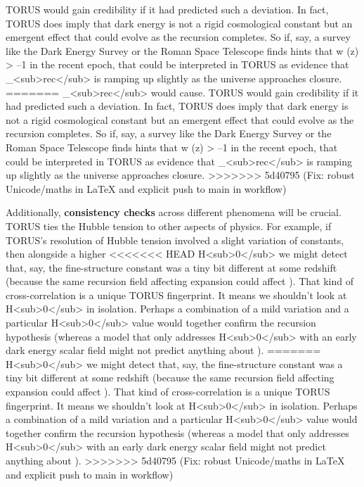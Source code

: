 \documentclass[]{article}
\begin{document}
TORUS would gain credibility if it had predicted such a deviation. In
fact, TORUS does imply that dark energy is not a rigid cosmological
constant but an emergent effect that could evolve as the recursion
completes\hspace{0pt}. So if, say, a survey like the Dark Energy Survey
or the Roman Space Telescope finds hints that w (z) \textgreater{} --1
in the recent epoch, that could be interpreted in TORUS as evidence that
\Lambda\_\textless sub\textgreater rec\textless/sub\textgreater{} is ramping
up slightly as the universe approaches closure.
=======
\Lambda\_\textless{}sub\textgreater{}rec\textless{}/sub\textgreater{} would
cause. TORUS would gain credibility if it had predicted such a
deviation. In fact, TORUS does imply that dark energy is not a rigid
cosmological constant but an emergent effect that could evolve as the
recursion completes​. So if, say, a survey like the Dark Energy Survey
or the Roman Space Telescope finds hints that w (z) \textgreater{} --1
in the recent epoch, that could be interpreted in TORUS as evidence that
\Lambda\_\textless{}sub\textgreater{}rec\textless{}/sub\textgreater{} is
ramping up slightly as the universe approaches closure.
>>>>>>> 5d40795 (Fix: robust Unicode/maths in LaTeX and explicit push to main in workflow)

Additionally, \textbf{consistency checks} across different phenomena
will be crucial. TORUS ties the Hubble tension to other aspects of
physics. For example, if TORUS's resolution of Hubble tension involved a
slight variation of constants, then alongside a higher
<<<<<<< HEAD
H\textless sub\textgreater0\textless/sub\textgreater{} we might detect
that, say, the fine-structure constant was a tiny bit different at some
redshift (because the same recursion field affecting expansion could
affect \alpha). That kind of cross-correlation is a unique TORUS fingerprint.
It means we shouldn't look at
H\textless sub\textgreater0\textless/sub\textgreater{} in isolation.
Perhaps a combination of a mild \alpha variation and a particular
H\textless sub\textgreater0\textless/sub\textgreater{} value would
together confirm the recursion hypothesis (whereas a model that only
addresses H\textless sub\textgreater0\textless/sub\textgreater{} with an
early dark energy scalar field might not predict anything about \alpha).
=======
H\textless{}sub\textgreater{}0\textless{}/sub\textgreater{} we might
detect that, say, the fine-structure constant was a tiny bit different
at some redshift (because the same recursion field affecting expansion
could affect \alpha). That kind of cross-correlation is a unique TORUS
fingerprint. It means we shouldn't look at
H\textless{}sub\textgreater{}0\textless{}/sub\textgreater{} in
isolation. Perhaps a combination of a mild \alpha variation and a particular
H\textless{}sub\textgreater{}0\textless{}/sub\textgreater{} value would
together confirm the recursion hypothesis (whereas a model that only
addresses H\textless{}sub\textgreater{}0\textless{}/sub\textgreater{}
with an early dark energy scalar field might not predict anything about
\alpha).
>>>>>>> 5d40795 (Fix: robust Unicode/maths in LaTeX and explicit push to main in workflow)
\end{document}
